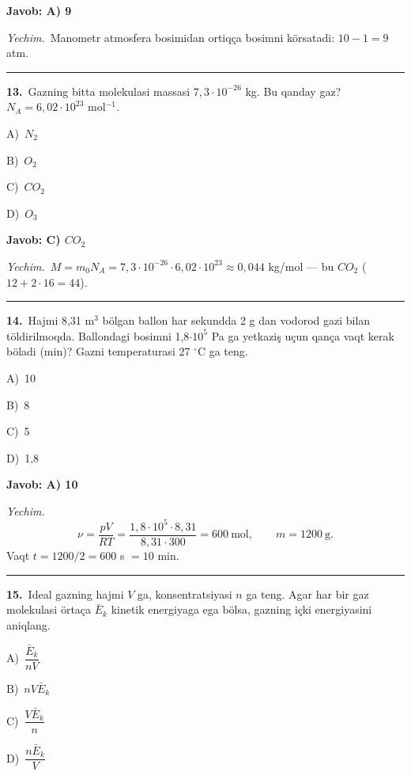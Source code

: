\documentclass[11pt,a4paper]{article}
\newcommand{\opt}[2]{\hspace*{4mm}#1)\ #2\par}
\begin{document}
\noindent\colorbox{gray!12}{\parbox{\dimexpr\linewidth-2\fboxsep}{\textbf{Javob: A) 9}}}\par\smallskip
\noindent\textit{Yechim.}\ Manometr atmosfera bosimidan ortiqça bosimni körsatadi: $10-1=9$ atm.\par\par\medskip\hrule\medskip
{}\noindent\begin{minipage}{\linewidth}
\textbf{13.}\ Gazning bitta molekulasi massasi $7{,}3\cdot10^{-26}$ kg. Bu qanday gaz? $N_A=6{,}02\cdot10^{23}$ mol$^{-1}$.\par\smallskip
\opt{A}{$N_2$}
\opt{B}{$O_2$}
\opt{C}{$CO_2$}
\opt{D}{$O_3$}
\end{minipage}\vspace{2pt}\par
\noindent\colorbox{gray!12}{\parbox{\dimexpr\linewidth-2\fboxsep}{\textbf{Javob: C) $CO_2$}}}\par\smallskip
\noindent\textit{Yechim.}\ $M=m_0N_A=7{,}3\cdot10^{-26}\cdot6{,}02\cdot10^{23}\approx0{,}044$ kg/mol — bu $CO_2$ ($12+2\cdot16=44$).\par\par\medskip\hrule\medskip
{}\noindent\begin{minipage}{\linewidth}
\textbf{14.}\ Hajmi 8,31 m$^{3}$ bölgan ballon har sekundda 2 g dan vodorod gazi bilan töldirilmoqda. Ballondagi bosimni 1,8$\cdot10^{5}$ Pa ga yetkaziş uçun qança vaqt kerak böladi (min)? Gazni temperaturasi 27 $^\circ$C ga teng.\par\smallskip
\opt{A}{10}
\opt{B}{8}
\opt{C}{5}
\opt{D}{1,8}
\end{minipage}\vspace{2pt}\par
\noindent\colorbox{gray!12}{\parbox{\dimexpr\linewidth-2\fboxsep}{\textbf{Javob: A) 10}}}\par\smallskip
\noindent\textit{Yechim.}\ \[\nu=\frac{pV}{RT}=\frac{1{,}8\cdot10^5\cdot8{,}31}{8{,}31\cdot300}=600\ \text{mol},\qquad m=1200\ \text{g}.\]
Vaqt $t=1200/2=600$ s $=10$ min.\par\par\medskip\hrule\medskip
{}\noindent\begin{minipage}{\linewidth}
\textbf{15.}\ Ideal gazning hajmi $V$ ga, konsentratsiyasi $n$ ga teng. Agar har bir gaz molekulasi örtaça $\bar{E}_k$ kinetik energiyaga ega bölsa, gazning içki energiyasini aniqlang.\par\smallskip
\opt{A}{$\dfrac{\bar{E}_k}{nV}$}
\opt{B}{$nV\bar{E}_k$}
\opt{C}{$\dfrac{V\bar{E}_k}{n}$}
\opt{D}{$\dfrac{n\bar{E}_k}{V}$}
\end{minipage}\vspace{2pt}\par
\end{document}
